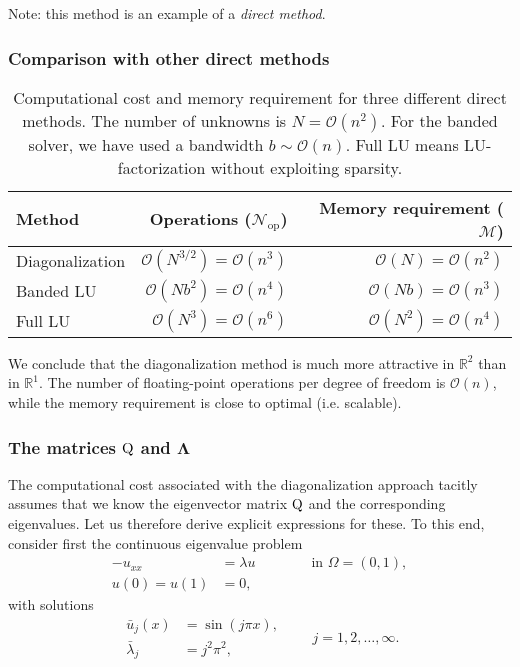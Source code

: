Note: this method is an example of a {\em direct method}.

\subsubsection{Comparison with other direct methods}

\begin{table}
    \caption{
      Computational cost and memory requirement for three different
      direct methods. The number of unknowns is $N=\mathcal{O}(n^2)$. For the
      banded solver, we have used a bandwidth $b \sim \mathcal{O}(n)$. Full LU
      means LU-factorization without exploiting sparsity.
    }
    \label{tab:DirectMethods_ComputationalCost}
  \begin{center}
    \bgroup{}
    \begin{tabular}{lrr}
      \hline
      Method & Operations ($\mathcal{N}_\text{op}$) & Memory requirement ($\mathcal{M}$) \\
      \hline
      Diagonalization & $\mathcal{O}(N^{3/2}) = \mathcal{O}(n^3)$ & $\mathcal{O}(N) = \mathcal{O}(n^2)$ \\
      Banded LU & $\mathcal{O}(N b^2) = \mathcal{O}(n^4)$ & $\mathcal{O}(Nb) = \mathcal{O}(n^3)$ \\
      Full LU & $\mathcal{O}(N^3) = \mathcal{O}(n^6)$ & $\mathcal{O}(N^2) = \mathcal{O}(n^4)$ \\
      \hline
    \end{tabular}
    \egroup
  \end{center}
\end{table}

We conclude that the diagonalization method is much more attractive in
$\mathbb{R}^2$ than in $\mathbb{R}^1$. The number of floating-point operations
per degree of freedom is $\mathcal{O}(n)$, while the memory requirement is close to optimal (i.e. scalable).

\subsubsection{The matrices ${\mathrm Q}$ and $\bm \Lambda$}

The computational cost associated with the diagonalization approach tacitly
assumes that we know the eigenvector matrix ${\mathrm Q}$ and the corresponding
eigenvalues. Let us therefore derive explicit expressions for these. To this
end, consider first the continuous eigenvalue problem
\begin{equation*}
  \begin{split}
    -u_{xx} &= \lambda u \qquad \qquad \text{in } \Omega=(0,1), \\
    u(0) = u(1) &= 0,
  \end{split}
\end{equation*}
with solutions
\begin{equation*}
  \begin{split}
    \bar{u}_j(x) &= \sin(j \pi x), \\
    \bar{\lambda}_j &= j^2 \pi^2,
  \end{split}
  \qquad j=1,2,\ldots,\infty.
\end{equation*}

